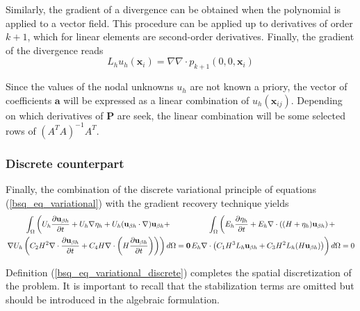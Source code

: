 Similarly, the gradient of a divergence can be obtained when the polynomial is applied to a vector field. This procedure can be applied up to derivatives of order $k+1$, which for linear elements are second-order derivatives. Finally, the gradient of the divergence reads
\begin{equation}
    L_h u_h (\mathbf{x}_i) = \nabla \nabla \cdot p_{k+1} (0,0,\mathbf{x}_i)
\end{equation}

Since the values of the nodal unknowns $u_h$ are not known a priory, the vector of coefficients $\mathbf{a}$ will be expressed as a linear combination of $u_h(\mathbf{x}_{ij})$. Depending on which derivatives of $\mathbf{P}$ are seek, the linear combination will be some selected rows of $(A^T A)^{-1}A^T$.



\subsubsection{Discrete counterpart}


Finally, the combination of the discrete variational principle of equations (\ref{bsq_eq_variational}) with the gradient recovery technique yields
\begin{subequations} \label{bsq_eq_variational_discrete}
    \begin{multline}
        \int_\Omega\left(
        U_h\pder{\mathbf{u}_{\beta h}}{t} + U_h\nabla \eta_h + U_h(\mathbf{u}_{\beta h} \cdot \nabla) \mathbf{u}_{\beta h} +
        \right. \\ \left.
            \nabla U_h \left( C_2 H^2 \nabla \cdot \pder{\mathbf{u}_{\beta h}}{t} 
                + C_4 H \nabla \cdot \left(H \pder{\mathbf{u}_{\beta h}}{t}\right) \right)
        \right)d\Omega = \mathbf{0}
    \end{multline}
    \begin{multline}
        \int_\Omega\left(
        E_h \pder{\eta_h}{t} + E_h\nabla \cdot \left((H+\eta_h)\mathbf{u}_{\beta h}\right) +
        \right. \\ \left.  \vphantom{E_h \pder{\eta_h}{t}}
            E_h\nabla \cdot \left(C_1 H^3 L_h \mathbf{u}_{\beta h} + C_3 H^2 L_h (H\mathbf{u}_{\beta h}) \right)
        \right)d\Omega = 0
    \end{multline}
\end{subequations}

Definition (\ref{bsq_eq_variational_discrete}) completes the spatial discretization of the problem. It is important to recall that the stabilization terms are omitted but should be introduced in the algebraic formulation.

